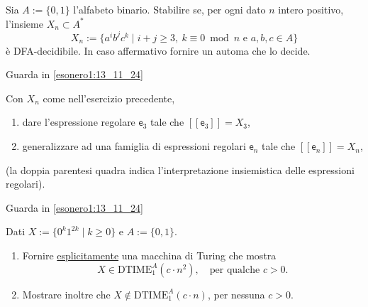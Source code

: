 \begin{ex}
Sia $A:=\{0,1\}$ l'alfabeto binario. Stabilire se, per ogni dato $n$ intero positivo, l'insieme $X_n\subset A^*$
\[
X_n:=\{a^ib^jc^k \mid i+j\geq 3,\ k\equiv 0 \bmod n \text{ e } a,b,c\in A\}
\]
è DFA-decidibile. In caso affermativo fornire un automa che lo decide.
\end{ex}
\begin{sol}
    Guarda in \ref{esonero1:13_11_24}
\end{sol}

\newpage

\begin{ex}
Con $X_n$ come nell'esercizio precedente,
\begin{enumerate}
    \item dare l'espressione regolare $\mathsf{e}_3$ tale che $[\![\mathsf{e}_3]\!]=X_3$,
    \item generalizzare ad una famiglia di espressioni regolari $\mathsf{e}_n$ tale che $[\![\mathsf{e}_n]\!]=X_n$,
\end{enumerate}
(la doppia parentesi quadra indica l'interpretazione insiemistica delle espressioni regolari).
\end{ex}
\begin{sol}
    Guarda in \ref{esonero1:13_11_24}
\end{sol}

\newpage

\begin{ex}
Dati $X := \{0^k 1^{2k} \mid k \geq 0\}$ e $A := \{0,1\}$.
\begin{enumerate}
    \item Fornire \underline{esplicitamente} una macchina di Turing che mostra
    \[
        X \in \mathrm{DTIME}_1^A(c \cdot n^2), \quad \text{per qualche } c > 0.
    \]
    \item Mostrare inoltre che $X \notin \mathrm{DTIME}_1^A(c \cdot n)$, per nessuna $c > 0$.
\end{enumerate}
\end{ex}

